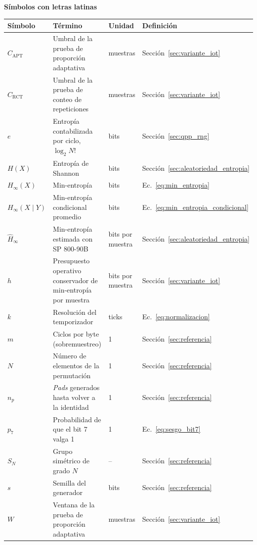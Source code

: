 \cleardoublepage
{}

{\bfseries\fontsize{14}{16}\selectfont Símbolos con letras latinas\par}
\nopagebreak\vspace{0.5ex}
{\small\interlineadoSencillo\setlength{\LTleft}{0pt}\setlength{\LTright}{0pt plus 1fill}
\begin{longtable}{@{}p{1.7cm}p{7.3cm}p{1.9cm}p{3.1cm}@{}}
\textbf{Símbolo} & \textbf{Término} & \textbf{Unidad} & \textbf{Definición}\\[0.6ex]
\endhead
$C_{\text{APT}}$ & Umbral de la prueba de proporción adaptativa & muestras & Sección~\ref{sec:variante_iot}\\[0.6ex]
$C_{\text{RCT}}$ & Umbral de la prueba de conteo de repeticiones & muestras & Sección~\ref{sec:variante_iot}\\[0.6ex]
$e$ & Entropía contabilizada por ciclo, $\log_2 N!$ & bits & Sección~\ref{sec:qpp_rng}\\[0.6ex]
$H(X)$ & Entropía de Shannon & bits & Sección~\ref{sec:aleatoriedad_entropia}\\[0.6ex]
$H_{\infty}(X)$ & Min-entropía & bits & Ec.~\eqref{eq:min_entropia}\\[0.6ex]
$H_{\infty}(X \mid Y)$ & Min-entropía condicional promedio & bits & Ec.~\eqref{eq:min_entropia_condicional}\\[0.6ex]
$\hat{H}_{\infty}$ & Min-entropía estimada con SP 800-90B & bits por muestra & Sección~\ref{sec:aleatoriedad_entropia}\\[0.6ex]
$h$ & Presupuesto operativo conservador de min-entropía por muestra & bits por muestra & Sección~\ref{sec:variante_iot}\\[0.6ex]
$k$ & Resolución del temporizador & ticks & Ec.~\eqref{eq:normalizacion}\\[0.6ex]
$m$ & Ciclos por byte (sobremuestreo) & 1 & Sección~\ref{sec:referencia}\\[0.6ex]
$N$ & Número de elementos de la permutación & 1 & Sección~\ref{sec:referencia}\\[0.6ex]
$n_p$ & \textit{Pads} generados hasta volver a la identidad & 1 & Sección~\ref{sec:referencia}\\[0.6ex]
$p_7$ & Probabilidad de que el bit 7 valga 1 & 1 & Ec.~\eqref{eq:sesgo_bit7}\\[0.6ex]
$S_N$ & Grupo simétrico de grado $N$ & -- & Sección~\ref{sec:referencia}\\[0.6ex]
$s$ & Semilla del generador & bits & Sección~\ref{sec:referencia}\\[0.6ex]
$W$ & Ventana de la prueba de proporción adaptativa & muestras & Sección~\ref{sec:variante_iot}\\
\end{longtable}}

